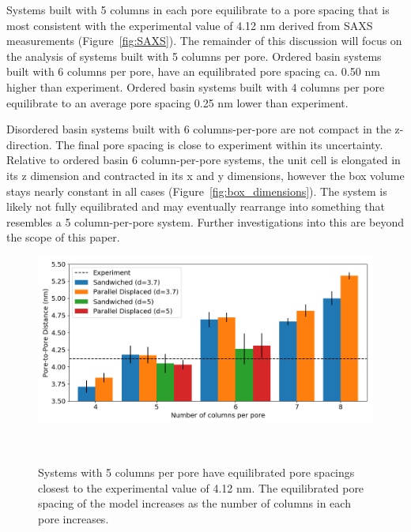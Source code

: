 \documentclass[journal=jpcbfk,manusciprt=article]{achemso}
\begin{document}
  Systems built with 5 columns in each pore equilibrate to a pore spacing that is most 
  consistent with the experimental value of 4.12 nm derived from SAXS measurements 
  (Figure~\ref{fig:SAXS}). The remainder of this discussion will focus on the analysis of
  systems built with 5 columns per pore. Ordered basin systems built with 6 columns per pore,
  have an equilibrated pore spacing ca. 0.50 nm higher than experiment. Ordered basin systems
  built with 4 columns per pore equilibrate to an average pore spacing 0.25 nm lower than experiment. 
  
  Disordered basin systems built with 6 columns-per-pore are not compact in the z-direction.
  The final pore spacing is close to experiment within its uncertainty. Relative to ordered basin 
  6 column-per-pore systems, the unit cell is elongated in its z dimension and contracted in its
  x and y dimensions, however the box volume stays nearly constant in all cases 
  (Figure~\ref{fig:box_dimensions}). The system is likely not fully equilibrated and may eventually
  rearrange into something that resembles a 5 column-per-pore system. Further investigations 
  into this are beyond the scope of this paper.

  \begin{figure}[!htb]
	\centering
	\includegraphics[width=\linewidth]{p2p.png}
	\caption{Systems with 5 columns per pore have equilibrated pore spacings closest to
			 the experimental value of 4.12 nm. The equilibrated pore spacing of the model 	
			 increases as the number of columns in each pore increases.}~\label{fig:p2p}
  \end{figure}  
\end{document}
